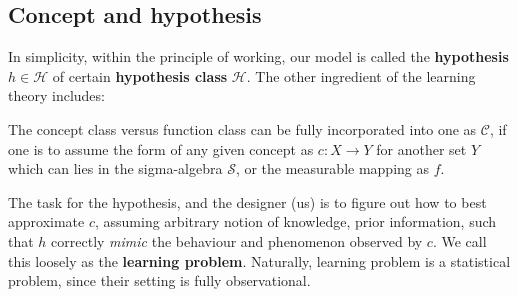 %    

\subsection{Concept and hypothesis}

In simplicity, within the principle of working, our model is called the \textbf{hypothesis} $h\in \mathcal{H}$ of certain \textbf{hypothesis class} $\mathcal{H}$. The other ingredient of the learning theory includes: 

The concept class versus function class can be fully incorporated into one as $\mathcal{C}$, if one is to assume the form of any given concept as $c: X\to Y$ for another set $Y$ which can lies in the sigma-algebra $\mathcal{S}$, or the measurable mapping as $f$. 

The task for the hypothesis, and the designer (us) is to figure out how to best approximate $c$, assuming arbitrary notion of knowledge, prior information, such that $h$ correctly \textit{mimic} the behaviour and phenomenon observed by $c$. We call this loosely as the \textbf{learning problem}. Naturally, learning problem is a statistical problem, since their setting is fully observational. 

